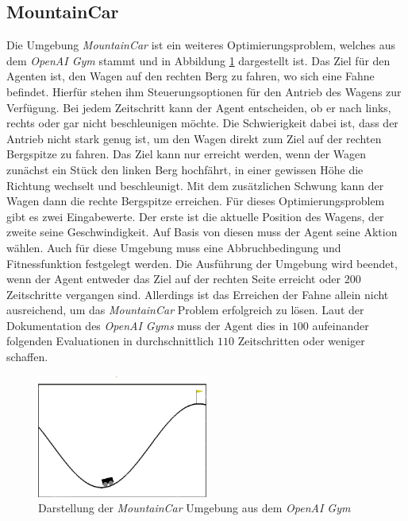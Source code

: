 \subsection{MountainCar}
\label{subsec:analysis_mountain_car}
Die Umgebung \emph{MountainCar} ist ein weiteres Optimierungsproblem, welches aus dem \emph{OpenAI Gym} stammt und in Abbildung \ref{fig:mountain_car_env} dargestellt ist. Das Ziel für den Agenten ist, den Wagen auf den rechten Berg zu fahren, wo sich eine Fahne befindet. Hierfür stehen ihm Steuerungsoptionen für den Antrieb des Wagens zur Verfügung. Bei jedem Zeitschritt kann der Agent entscheiden, ob er nach links, rechts oder gar nicht beschleunigen möchte. Die Schwierigkeit dabei ist, dass der Antrieb nicht stark genug ist, um den Wagen direkt zum Ziel auf der rechten Bergspitze zu fahren. Das Ziel kann nur erreicht werden, wenn der Wagen zunächst ein Stück den linken Berg hochfährt, in einer gewissen Höhe die Richtung wechselt und beschleunigt. Mit dem zusätzlichen Schwung kann der Wagen dann die rechte Bergspitze erreichen. Für dieses Optimierungsproblem gibt es zwei Eingabewerte. Der erste ist die aktuelle Position des Wagens, der zweite seine Geschwindigkeit. Auf Basis von diesen muss der Agent seine Aktion wählen. Auch für diese Umgebung muss eine Abbruchbedingung und Fitnessfunktion festgelegt werden. Die Ausführung der Umgebung wird beendet, wenn der Agent entweder das Ziel auf der rechten Seite erreicht oder $200$ Zeitschritte vergangen sind. Allerdings ist das Erreichen der Fahne allein nicht ausreichend, um das \emph{MountainCar} Problem erfolgreich zu lösen. Laut der Dokumentation des \emph{OpenAI Gyms} muss der Agent dies in $100$ aufeinander folgenden Evaluationen in durchschnittlich $110$ Zeitschritten oder weniger schaffen.
\begin{figure}[!h]
	\centering
	\includegraphics[width=0.5\textwidth]{./img/mountain_car_env.JPG} 
	\caption{Darstellung der \emph{MountainCar} Umgebung aus dem \emph{OpenAI Gym}}
	\label{fig:mountain_car_env}
\end{figure} 
\\\\

